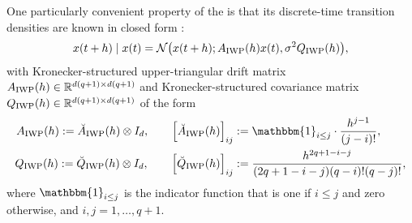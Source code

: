 \documentclass{mimosis}
\begin{document}
\begin{exmple}
One particularly convenient property of the  is that its discrete-time transition densities are known in closed form
\parencite{kersting18_conver_rates_gauss_ode_filter}:
\begin{equation}
  \st(t+h) \mid \st(t) = \N(\st(t+h); \transA_\text{IWP}(h) \st(t), \sigma^2 \transC_\text{IWP}(h)),
\end{equation}
with Kronecker-structured upper-triangular drift matrix
\({A_\text{IWP}(h) \in \mathbb{R}^{d(q+1) \times d(q+1)}}\)
and Kronecker-structured covariance matrix
\({Q_\text{IWP}(h) \in \mathbb{R}^{d(q+1) \times d(q+1)}}\)
of the form
\begin{subequations}
\begin{align}
\transA_\text{IWP}(h) := \breve{\transA}_\text{IWP}(h) \otimes I_d,
\qquad
\left[ \breve{\transA}_\text{IWP}(h) \right]_{ij} &:=
  \mathbbm{1}_{i \leq j} \cdot \frac{h^{j-1}}{(j-i)!},
\\
\transC_\text{IWP}(h) := \breve{\transC}_\text{IWP}(h) \otimes I_d,
\qquad
\left[ \breve{\transC}_\text{IWP}(h) \right]_{ij} &:=
  \frac{h^{2q+1-i-j}}{(2q+1-i-j)(q-i)!(q-j)!},
\end{align}
\end{subequations}
where \(\mathbbm{1}_{i \leq j}\) is the indicator function that is one if \(i \leq j\) and zero otherwise, and \({i, j = 1, \dots, q+1}\).
\label{remark:iwp}
\end{exmple}
\end{document}

